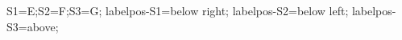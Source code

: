 \documentclass[exercice]{thedocument}%
\begin{document}
%
\>S1=E;\>S2=F;\>S3=G;%
\>labelpos-S1=below right;%
\>labelpos-S2=below left;%
\>labelpos-S3=above;%
%
\end{document}
